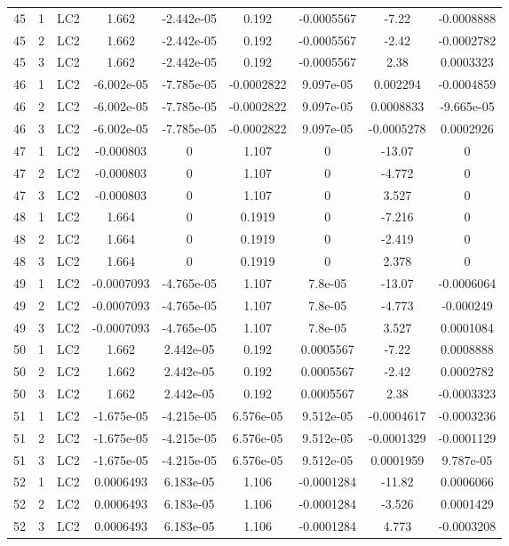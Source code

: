 \documentclass{article}%
\begin{document}
\begin{longtable}{| c c c | c c c c c c |}
45&1&LC2&1.662&{-}2.442e{-}05&0.192&{-}0.0005567&{-}7.22&{-}0.0008888\\%
45&2&LC2&1.662&{-}2.442e{-}05&0.192&{-}0.0005567&{-}2.42&{-}0.0002782\\%
45&3&LC2&1.662&{-}2.442e{-}05&0.192&{-}0.0005567&2.38&0.0003323\\%
46&1&LC2&{-}6.002e{-}05&{-}7.785e{-}05&{-}0.0002822&9.097e{-}05&0.002294&{-}0.0004859\\%
46&2&LC2&{-}6.002e{-}05&{-}7.785e{-}05&{-}0.0002822&9.097e{-}05&0.0008833&{-}9.665e{-}05\\%
46&3&LC2&{-}6.002e{-}05&{-}7.785e{-}05&{-}0.0002822&9.097e{-}05&{-}0.0005278&0.0002926\\%
47&1&LC2&{-}0.000803&0&1.107&0&{-}13.07&0\\%
47&2&LC2&{-}0.000803&0&1.107&0&{-}4.772&0\\%
47&3&LC2&{-}0.000803&0&1.107&0&3.527&0\\%
48&1&LC2&1.664&0&0.1919&0&{-}7.216&0\\%
48&2&LC2&1.664&0&0.1919&0&{-}2.419&0\\%
48&3&LC2&1.664&0&0.1919&0&2.378&0\\%
49&1&LC2&{-}0.0007093&{-}4.765e{-}05&1.107&7.8e{-}05&{-}13.07&{-}0.0006064\\%
49&2&LC2&{-}0.0007093&{-}4.765e{-}05&1.107&7.8e{-}05&{-}4.773&{-}0.000249\\%
49&3&LC2&{-}0.0007093&{-}4.765e{-}05&1.107&7.8e{-}05&3.527&0.0001084\\%
50&1&LC2&1.662&2.442e{-}05&0.192&0.0005567&{-}7.22&0.0008888\\%
50&2&LC2&1.662&2.442e{-}05&0.192&0.0005567&{-}2.42&0.0002782\\%
50&3&LC2&1.662&2.442e{-}05&0.192&0.0005567&2.38&{-}0.0003323\\%
51&1&LC2&{-}1.675e{-}05&{-}4.215e{-}05&6.576e{-}05&9.512e{-}05&{-}0.0004617&{-}0.0003236\\%
51&2&LC2&{-}1.675e{-}05&{-}4.215e{-}05&6.576e{-}05&9.512e{-}05&{-}0.0001329&{-}0.0001129\\%
51&3&LC2&{-}1.675e{-}05&{-}4.215e{-}05&6.576e{-}05&9.512e{-}05&0.0001959&9.787e{-}05\\%
52&1&LC2&0.0006493&6.183e{-}05&1.106&{-}0.0001284&{-}11.82&0.0006066\\%
52&2&LC2&0.0006493&6.183e{-}05&1.106&{-}0.0001284&{-}3.526&0.0001429\\%
52&3&LC2&0.0006493&6.183e{-}05&1.106&{-}0.0001284&4.773&{-}0.0003208\\%

\end{longtable}
\end{document}

